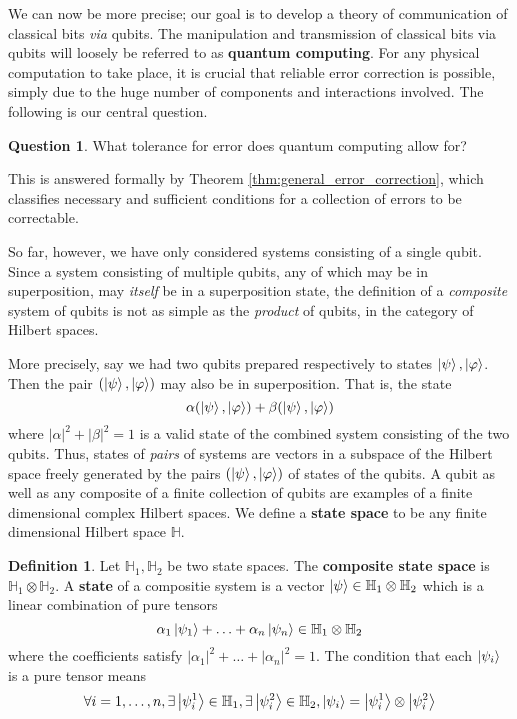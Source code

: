 \documentclass[12pt]{article}
\theoremstyle{plain}
\theoremstyle{definition}
\newtheorem{defn}[thm]{Definition} %
\newtheorem{question}[thm]{Question}
\newcommand{\bb}[1]{\mathbb{#1}}
\begin{document}
	We can now be more precise; our goal is to develop a theory of communication of classical bits \emph{via} qubits. The manipulation and transmission of classical bits via qubits will loosely be referred to as \textbf{quantum computing}. For any physical computation to take place, it is crucial that reliable error correction is possible, simply due to the huge number of components and interactions involved. The following is our central question.
	\begin{question}\label{question:error_correction}
		What tolerance for error does quantum computing allow for?
		\end{question}
	This is answered formally by Theorem \ref{thm:general_error_correction}, which classifies necessary and sufficient conditions for a collection of errors to be correctable.
	
	So far, however, we have only considered systems consisting of a single qubit. Since a system consisting of multiple qubits, any of which may be in superposition, may \emph{itself} be in a superposition state, the definition of a \emph{composite} system of qubits is not as simple as the \emph{product} of qubits, in the category of Hilbert spaces.
	
	More precisely, say we had two qubits prepared respectively to states $\ket{\psi}, \ket{\varphi}$. Then the pair $(\ket{\psi}, \ket{\varphi})$ may also be in superposition. That is, the state
	\begin{equation}
		\alpha (\ket{\psi}, \ket{\varphi}) + \beta (\ket{\psi}, \ket{\varphi})
		\end{equation}
	where $|\alpha|^2 + |\beta|^2 = 1$ is a valid state of the combined system consisting of the two qubits. Thus, states of \emph{pairs} of systems are vectors in a subspace of the Hilbert space freely generated by the pairs $(\ket{\psi},\ket{\varphi})$ of states of the qubits. A qubit as well as any composite of a finite collection of qubits are examples of a finite dimensional complex Hilbert spaces. We define a \textbf{state space} to be any finite dimensional Hilbert space $\bb{H}$.
	
	\begin{defn}\label{def:composite_system}
		Let $\bb{H}_1,\bb{H}_2$ be two state spaces. The \textbf{composite state space} is $\bb{H}_1 \otimes \bb{H}_2$. A \textbf{state} of a compositie system is a vector $\ket{\psi} \in \bb{H}_1 \otimes \bb{H}_2$ which is a linear combination of pure tensors
		\begin{equation}\label{eq:sum_pure_tensors}
			\alpha_{1}\ket{\psi_1} + \ldots + \alpha_n\ket{\psi_n} \in \bb{H}_1 \otimes \bb{H}_2
			\end{equation}
		where the coefficients satisfy $|\alpha_1|^2 + \ldots + |\alpha_n|^2 = 1$. The condition that each $\ket{\psi_i}$ is a pure tensor means
		\begin{equation}
			\forall i =1,\ldots, n, \exists \ket{\psi_i^1}\in \bb{H}_1,\exists \ket{\psi_i^2}\in \bb{H}_2, \ket{\psi_i} = \ket{\psi_i^1} \otimes \ket{\psi_i^2}
			\end{equation}
	\end{defn}
	
\end{document}
